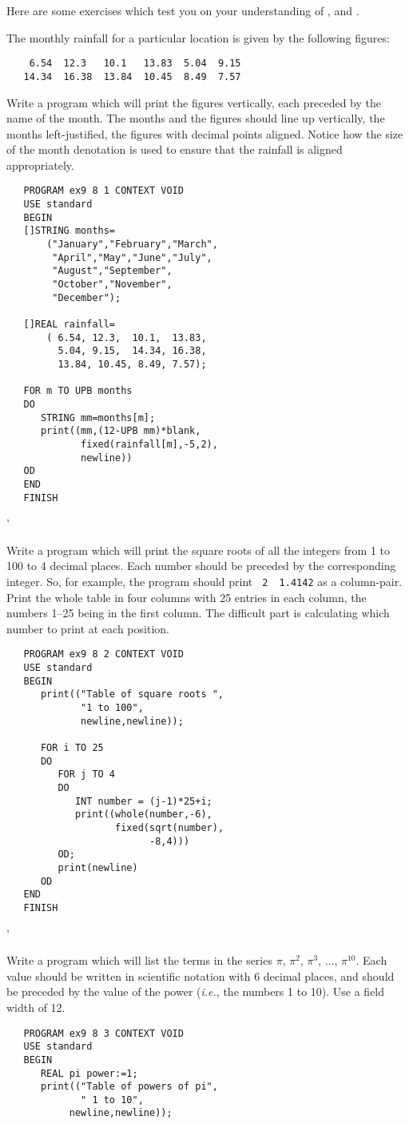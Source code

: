Here are some exercises which test you on your understanding of
,  and .

\begin{exercise}
\item The monthly rainfall for a particular location is given by the
following figures:
\begin{verbatim}
    6.54  12.3   10.1   13.83  5.04  9.15
   14.34  16.38  13.84  10.45  8.49  7.57
\end{verbatim}
\noindent
Write a program which will print the figures vertically, each preceded
by the name of the month. The months and the figures should line up
vertically, the months left-justified, the figures with decimal points
aligned. \ans Notice how the size of the month denotation is used to
ensure that the rainfall is aligned appropriately.
\begin{verbatim}
   PROGRAM ex9 8 1 CONTEXT VOID
   USE standard
   BEGIN
   []STRING months=
       ("January","February","March",
        "April","May","June","July",
        "August","September",
        "October","November",
        "December");

   []REAL rainfall=
       ( 6.54, 12.3,  10.1,  13.83,
         5.04, 9.15,  14.34, 16.38,
         13.84, 10.45, 8.49, 7.57);

   FOR m TO UPB months
   DO
      STRING mm=months[m];
      print((mm,(12-UPB mm)*blank,
             fixed(rainfall[m],-5,2),
             newline))
   OD
   END
   FINISH
\end{verbatim}
'
\item Write a program which will print the square roots of all the
integers from 1 to 100 to 4 decimal places. Each number should be
preceded by the corresponding integer. So, for example, the program
should print \verb*| 2  1.4142| as a column-pair. Print the whole table
in four columns with 25 entries in each column, the numbers 1--25 being
in the first column. \ans The difficult part is calculating which
number to print at each position.
\begin{verbatim}
   PROGRAM ex9 8 2 CONTEXT VOID
   USE standard
   BEGIN
      print(("Table of square roots ",
             "1 to 100",
             newline,newline));

      FOR i TO 25
      DO
         FOR j TO 4
         DO
            INT number = (j-1)*25+i;
            print((whole(number,-6),
                   fixed(sqrt(number),
                         -8,4)))
         OD;
         print(newline)
      OD
   END
   FINISH
\end{verbatim}
'
\item Write a program which will list the terms in the series $\pi$,
$\pi^2$, $\pi^3$, $\ldots$, $\pi^{10}$. Each value should be written in
scientific notation with 6 decimal places, and should be preceded by
the value of the power ({\it i.e.}, the numbers 1 to 10). Use a field
width of 12. \ans \ %
\begin{verbatim}
   PROGRAM ex9 8 3 CONTEXT VOID
   USE standard
   BEGIN
      REAL pi power:=1;
      print(("Table of powers of pi",
             " 1 to 10",
           newline,newline));


\end{verbatim}
\end{exercise}
